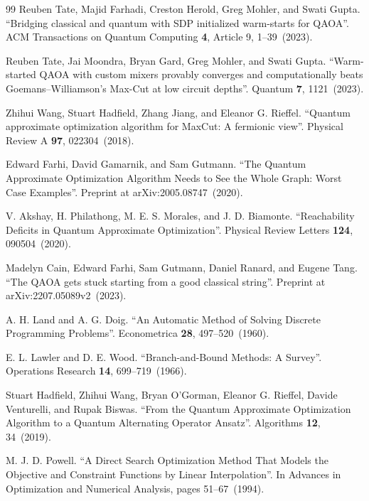 \begin{thebibliography}{99}
Reuben Tate, Majid Farhadi, Creston Herold, Greg Mohler, and Swati Gupta.
\newblock ``Bridging classical and quantum with SDP initialized warm-starts for QAOA''.
\newblock ACM Transactions on Quantum Computing {\bf 4}, Article 9, 1--39~(2023).

Reuben Tate, Jai Moondra, Bryan Gard, Greg Mohler, and Swati Gupta.
\newblock ``Warm-started QAOA with custom mixers provably converges and computationally beats Goemans--Williamson's Max-Cut at low circuit depths''.
\newblock Quantum {\bf 7}, 1121~(2023).

Zhihui Wang, Stuart Hadfield, Zhang Jiang, and Eleanor G. Rieffel.
\newblock ``Quantum approximate optimization algorithm for MaxCut: A fermionic view''.
\newblock Physical Review A {\bf 97}, 022304~(2018).


Edward Farhi, David Gamarnik, and Sam Gutmann.
\newblock ``The Quantum Approximate Optimization Algorithm Needs to See the Whole Graph: Worst Case Examples''.
\newblock Preprint at arXiv:2005.08747~(2020).


V. Akshay, H. Philathong, M. E. S. Morales, and J. D. Biamonte.
\newblock ``Reachability Deficits in Quantum Approximate Optimization''.
\newblock Physical Review Letters {\bf 124}, 090504~(2020).


Madelyn Cain, Edward Farhi, Sam Gutmann, Daniel Ranard, and Eugene Tang.
\newblock ``The QAOA gets stuck starting from a good classical string''.
\newblock Preprint at arXiv:2207.05089v2~(2023).


A. H. Land and A. G. Doig.
\newblock ``An Automatic Method of Solving Discrete Programming Problems''.
\newblock Econometrica {\bf 28}, 497--520~(1960).


E. L. Lawler and D. E. Wood.
\newblock ``Branch-and-Bound Methods: A Survey''.
\newblock Operations Research {\bf 14}, 699--719~(1966).


Stuart Hadfield, Zhihui Wang, Bryan O'Gorman, Eleanor G. Rieffel, Davide Venturelli, and Rupak Biswas.
\newblock ``From the Quantum Approximate Optimization Algorithm to a Quantum Alternating Operator Ansatz''.
\newblock Algorithms {\bf 12}, 34~(2019).


M. J. D. Powell.
\newblock ``A Direct Search Optimization Method That Models the Objective and Constraint Functions by Linear Interpolation''.
\newblock In Advances in Optimization and Numerical Analysis, pages 51--67~(1994).



\end{thebibliography}
